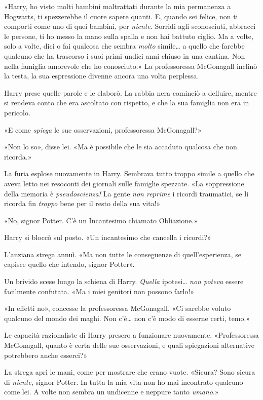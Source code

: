 «Harry, ho visto molti bambini maltrattati durante la mia permanenza a Hogwarts, ti spezzerebbe il cuore sapere quanti. E, quando sei felice, non ti comporti come uno di quei bambini, per \textit{niente}. Sorridi agli sconosciuti, abbracci le persone, ti ho messo la mano sulla spalla e non hai battuto ciglio. Ma a volte, solo a volte, dici o fai qualcosa che sembra \textit{molto} simile… a quello che farebbe qualcuno che ha trascorso i suoi primi undici anni chiuso in una cantina. Non nella famiglia amorevole che ho conosciuto.» La professoressa McGonagall inclinò la testa, la sua espressione divenne ancora una volta perplessa.

Harry prese quelle parole e le elaborò. La rabbia nera cominciò a defluire, mentre si rendeva conto che era ascoltato con rispetto, e che la sua famiglia non era in pericolo.

«E come \textit{spiega} le sue osservazioni, professoressa McGonagall?»

«Non lo so», disse lei. «Ma è possibile che le sia accaduto qualcosa che non ricorda.»

La furia esplose nuovamente in Harry. Sembrava tutto troppo simile a quello che aveva letto nei resoconti dei giornali sulle famiglie spezzate. «La soppressione della memoria è \textit{pseudoscienza!} La gente \textit{non reprime} i ricordi traumatici, se li ricorda fin \textit{troppo} bene per il resto della sua vita!»

«No, signor Potter. C’è un Incantesimo chiamato Obliazione.»

Harry si bloccò sul posto. «Un incantesimo che cancella i ricordi?»

L’anziana strega annuì. «Ma non tutte le conseguenze di quell’esperienza, se capisce quello che intendo, signor Potter».

Un brivido scese lungo la schiena di Harry. \textit{Quella} ipotesi… \textit{non poteva} essere facilmente confutata. «Ma i miei genitori non possono farlo!»

«In effetti no», concesse la professoressa McGonagall. «Ci sarebbe voluto qualcuno del mondo dei maghi. Non c’è… non c’è modo di esserne certi, temo.»

Le capacità razionaliste di Harry presero a funzionare nuovamente. «Professoressa McGonagall, quanto è certa delle sue osservazioni, e quali spiegazioni alternative potrebbero anche esserci?»

La strega aprì le mani, come per mostrare che erano vuote. «Sicura? Sono sicura di \textit{niente}, signor Potter. In tutta la mia vita non ho mai incontrato qualcuno come lei. A volte non sembra un undicenne e neppure tanto \textit{umano}.»

